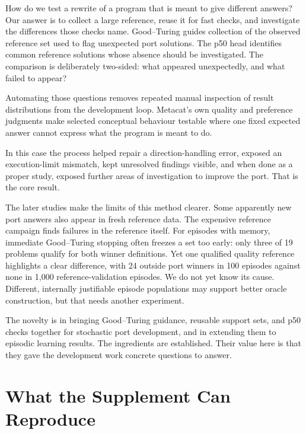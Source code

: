 \documentclass[10pt,letterpaper]{article}
\begin{document}
How do we test a rewrite of a program that is meant to give different answers? Our answer
is to collect a large reference, reuse it for fast checks, and investigate the differences
those checks name. Good--Turing guides collection of the observed reference set used to
flag unexpected port solutions. The p50 head identifies common reference solutions whose
absence should be investigated. The comparison is deliberately two-sided: what appeared
unexpectedly, and what failed to appear?

Automating those questions removes repeated manual inspection of result distributions from
the development loop. Metacat's own quality and preference judgments make selected
conceptual behaviour testable where one fixed expected answer cannot express what the
program is meant to do.

In this case the process helped repair a direction-handling error, exposed an
execution-limit mismatch, kept unresolved findings visible, and when done as a proper
study, exposed further areas of investigation to improve the port. That is the core
result.

The later studies make the limits of this method clearer. Some apparently new port answers
also appear in fresh reference data. The expensive reference campaign finds failures in
the reference itself. For episodes with memory, immediate Good--Turing stopping often
freezes a set too early: only three of 19 problems qualify for both winner definitions.
Yet one qualified quality reference highlights a clear difference, with 24 outside port
winners in 100 episodes against none in 1,000 reference-validation episodes. We do not yet
know its cause. Different, internally justifiable episode populations may support better
oracle construction, but that needs another experiment.

The novelty is in bringing Good--Turing guidance, reusable support sets, and p50 checks
together for stochastic port development, and in extending them to episodic learning
results. The ingredients are established. Their value here is that they gave the
development work concrete questions to answer.

\clearpage


\clearpage
\appendix

\section{What the Supplement Can Reproduce}\label{app:artifacts}
\end{document}
